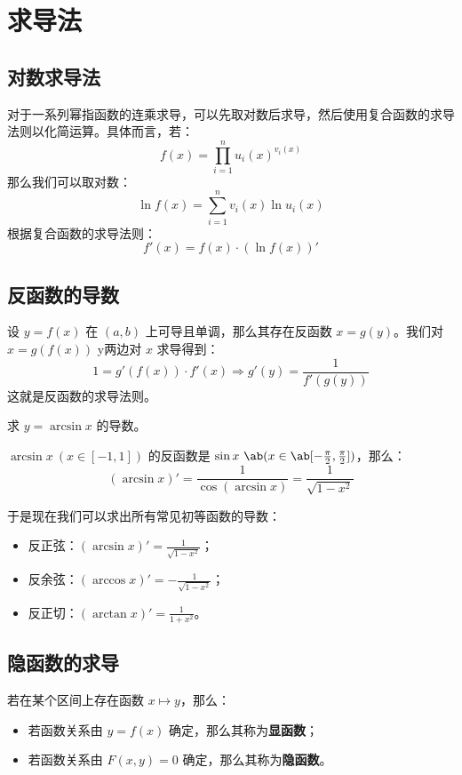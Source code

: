 \section{求导法}

\subsection{对数求导法}

对于一系列幂指函数的连乘求导，可以先取对数后求导，然后使用复合函数的求导法则以化简运算。具体而言，若：
$$
f(x) = \prod_{i=1}^n u_i(x)^{v_i(x)}
$$
那么我们可以取对数：
$$
\ln f(x) = \sum_{i=1}^n v_i(x) \ln u_i(x)
$$
根据复合函数的求导法则：
$$
f'(x) = f(x) \cdot (\ln f(x))'
$$

\subsection{反函数的导数}

设 $y = f(x)$ 在 $(a, b)$ 上可导且单调，那么其存在反函数 $x = g(y)$。我们对 $x = g(f(x))$ y两边对 $x$ 求导得到：
$$
1 = g'(f(x)) \cdot f'(x) \Rightarrow g'(y) = \frac{1}{f'(g(y))}
$$
这就是反函数的求导法则。

\begin{example}[反三角函数的导数]
	求 $y = \arcsin x$ 的导数。

	\begin{solution}
		$\arcsin x\ (x \in [-1, 1])$ 的反函数是 $\sin x\ \ab(x \in \ab[-\frac{\pi}{2}, \frac{\pi}{2}])$，那么：
		$$
		(\arcsin x)' = \frac{1}{\cos(\arcsin x)} = \frac{1}{\sqrt{1 - x^2}}
		$$
	\end{solution}
\end{example}

于是现在我们可以求出所有常见初等函数的导数：

\begin{itemize}
	\item 反正弦：$(\arcsin x)' = \frac{1}{\sqrt{1 - x^2}}$；
	\item 反余弦：$(\arccos x)' = -\frac{1}{\sqrt{1 - x^2}}$；
	\item 反正切：$(\arctan x)' = \frac{1}{1 + x^2}$。
\end{itemize}

\subsection{隐函数的求导}

\begin{definition}
	若在某个区间上存在函数 $x \mapsto y$，那么：

	\begin{itemize}
		\item 若函数关系由 $y = f(x)$ 确定，那么其称为\textbf{显函数}；
		\item 若函数关系由 $F(x, y) = 0$ 确定，那么其称为\textbf{隐函数}。
	\end{itemize}
\end{definition}

